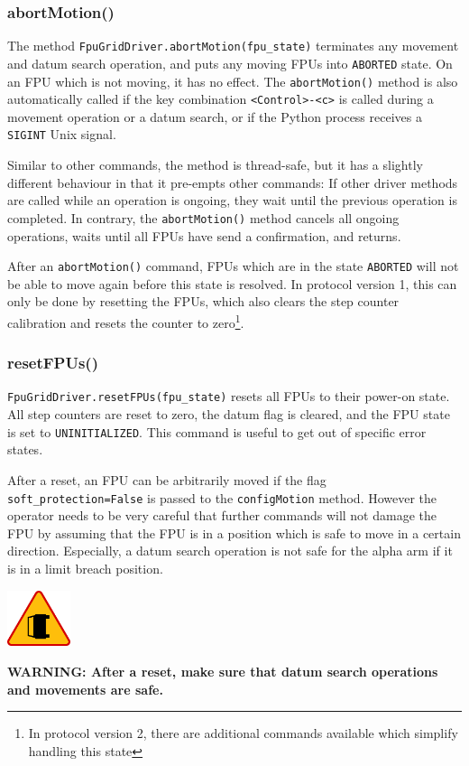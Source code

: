 \documentclass[11pt,a4paper]{scrartcl}
\newenvironment{warning}{\begin{framed}\includegraphics[width=5em]{accident-area-ahead.png}
}{\end{framed}}
\begin{document}
\subsubsection{abortMotion()}


\begin{sloppypar}
The method \texttt{FpuGridDriver.abortMotion(fpu\_state)} terminates
any movement and datum search operation, and puts any moving FPUs into
\texttt{ABORTED} state. On an FPU which is not moving, it has no
effect.  The \texttt{abortMotion()} method is also automatically
called if the key combination \verb+<Control>-<c>+ is called during a
movement operation or a datum search, or if the Python process
receives a \texttt{SIGINT} Unix signal.
\end{sloppypar}

Similar to other commands, the method is thread-safe, but it has a
slightly different behaviour in that it pre-empts other commands: If
other driver methods are called while an operation is ongoing, they
wait until the previous operation is completed. In contrary, the
\texttt{abortMotion()} method cancels all ongoing operations, waits
until all FPUs have send a confirmation, and returns.

After an \texttt{abortMotion()} command, FPUs which are in the state
\texttt{ABORTED} will not be able to move again before this state is
resolved. In protocol version 1, this can only be done by resetting
the FPUs, which also clears the step counter calibration and resets
the counter to zero\footnote{In protocol version 2, there are
  additional commands available which simplify handling this state}.


\subsubsection{resetFPUs()}

\texttt{FpuGridDriver.resetFPUs(fpu\_state)} resets all FPUs to their
power-on state. All step counters are reset to zero, the datum flag is
cleared, and the FPU state is set to \texttt{UNINITIALIZED}. This
command is useful to get out of specific error states. 

After a reset, an FPU can be arbitrarily
moved if the flag \texttt{soft\_protection=False} is passed to the
\texttt{configMotion} method. However the operator needs to be very
careful that further commands will not damage the FPU by assuming that
the FPU is in a position which is safe to move in a certain
direction. Especially, a datum search operation is not safe for the
alpha arm if it is in a limit breach position.
\begin{warning}
  \textbf{WARNING: After a reset, make sure that datum search
    operations and movements are safe.}
\end{warning}
\end{document}
